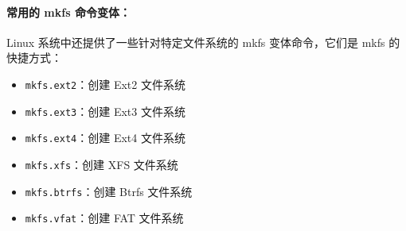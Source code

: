 \documentclass[12pt,UTF8]{ctexbook}
\begin{document}
\paragraph{常用的 mkfs 命令变体：}
Linux 系统中还提供了一些针对特定文件系统的 mkfs 变体命令，它们是 mkfs 的快捷方式：
\begin{itemize}
    \item \verb+mkfs.ext2+：创建 Ext2 文件系统
    \item \verb+mkfs.ext3+：创建 Ext3 文件系统
    \item \verb+mkfs.ext4+：创建 Ext4 文件系统
    \item \verb+mkfs.xfs+：创建 XFS 文件系统
    \item \verb+mkfs.btrfs+：创建 Btrfs 文件系统
    \item \verb+mkfs.vfat+：创建 FAT 文件系统
\end{itemize}
\end{document}
